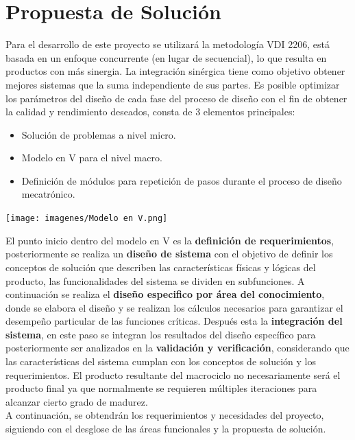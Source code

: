 \newpage
\section{Propuesta de Solución}
Para el desarrollo de este proyecto se utilizará la metodología VDI 2206, está basada en un enfoque concurrente (en lugar de secuencial), lo que resulta en productos con más sinergia. La integración sinérgica tiene como objetivo obtener mejores sistemas que la suma independiente de sus partes. Es posible optimizar los parámetros del diseño de cada fase del proceso de diseño con el fin de obtener la calidad y rendimiento deseados, consta de 3 elementos principales\cite{Referencia7}:
\begin{itemize}
    \item Solución de problemas a nivel micro.
    \item Modelo en V para el nivel macro.
    \item Definición de módulos para repetición de pasos durante el proceso de diseño mecatrónico.
\end{itemize}
\begin{center}
    \texttt{[image: imagenes/Modelo en V.png]}
    \label{fig:metodologia}
\end{center}
El punto inicio dentro del modelo en V es la \textbf{definición de requerimientos}, posteriormente se realiza un \textbf{diseño de sistema} con el objetivo de definir los conceptos de solución que describen las características físicas y lógicas del producto, las funcionalidades del sistema se dividen en subfunciones. A continuación se realiza el \textbf{diseño especifico por área del conocimiento}, donde se elabora el diseño y se realizan los cálculos necesarios para garantizar el desempeño particular de las funciones críticas. Después esta la \textbf{integración del sistema}, en este paso se integran los resultados del diseño específico para posteriormente ser analizados en la \textbf{validación y verificación}, considerando que las características del sistema cumplan con los conceptos de solución y los requerimientos. El producto resultante del macrociclo no necesariamente será el producto final ya que normalmente se requieren múltiples iteraciones para alcanzar cierto grado de madurez.\\
A continuación, se obtendrán los requerimientos y necesidades del proyecto, siguiendo con el desglose de las áreas funcionales y la propuesta de solución.

